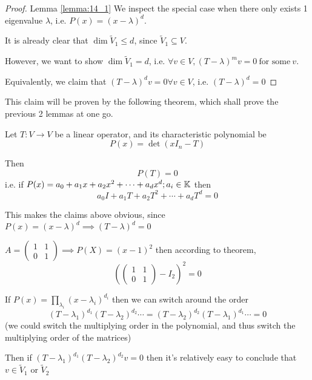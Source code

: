 \begin{proof} {Lemma \ref*{lemma:14_1}}
    We inspect the special case when there only exists 1 eigenvalue \(\lambda\), i.e. \(P(x) = (x- \lambda)^d\).

    It is already clear that \(\dim \tilde{V}_1 \leq d\), since \(\tilde{V}_1 \subseteq V\).

    However, we want to show \(\dim \tilde{V}_1 = d\), i.e. \(\forall v \in V, (T - \lambda)^m v = 0 \:\text{for some}\: v\).

    Equivalently, we claim that \((T - \lambda)^d v = 0 \forall v \in V\), i.e. \((T - \lambda)^d = 0\)
\end{proof}

This claim will be proven by the following theorem, which shall prove the previous 2 lemmas at one go.

\begin{theorem} 
    Let \(T: V \to V\) be a linear operator, and its characteristic polynomial be \[
        P(x) = \det (x I_n - T)
    \]

    Then \[
        P(T) = 0
    \]
    i.e. if \(P(x) = a_0 + a_1 x + a_2x^2 + \cdots + a_d x^d; a_i \in \mathbb{K}\) then \[
        a_0 I + a_1T + a_2T^2 + \cdots + a_d T^d = 0
    \]
\end{theorem}
\begin{remark}
    This makes the claims above obvious, since \(P(x) = (x-\lambda)^d \implies (T - \lambda)^d = 0\)
\end{remark}
\begin{example}
    \(A = \begin{pmatrix}
        1 & 1 \\
        0 & 1
    \end{pmatrix} \implies P(X) = (x-1)^2\) then according to theorem, \[
        \left(\begin{pmatrix}
                1 & 1 \\
                0 & 1
            \end{pmatrix} - I_2\right)^2 = 0
    \]

\end{example}

\begin{remark}
    If \(P(x) = \prod_{\lambda_i} (x - \lambda_i)^{d_i}\) then we can switch around the order \[
        (T - \lambda_1)^{d_1}(T - \lambda_2)^{d_2}\cdots = (T - \lambda_2)^{d_2}(T - \lambda_1)^{d_1}\cdots = 0
    \]
    (we could switch the multiplying order in the polynomial, and thus switch the multiplying order of the matrices)

    Then if \((T - \lambda_1)^{d_1}(T - \lambda_2)^{d_2} v = 0 \) then it's relatively easy to conclude that \(v \in \tilde{V}_1 \) or \(\tilde{V}_2\)
\end{remark}